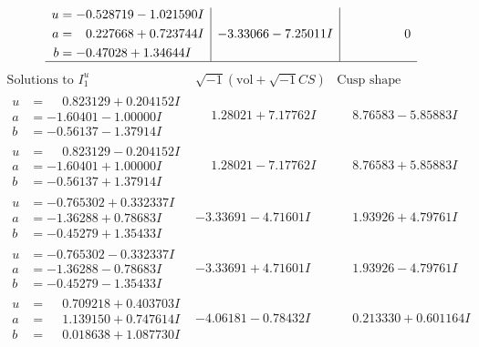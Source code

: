 \documentclass[1p]{elsarticle_modified}
\theoremstyle{definition}
\newcommand{\I}{\sqrt{-1}}
\begin{document}
$$\begin{array}{c|c|c}
\begin{aligned}
u &= -0.528719 - 1.021590 I \\
a &= \phantom{-}0.227668 + 0.723744 I \\
b &= -0.47028 + 1.34644 I\end{aligned}
 & -3.33066 - 7.25011 I & \phantom{-0.000000 } 0\\
 \hline 
 \end{array}$$\newpage$$\begin{array}{c|c|c}  
\text{Solutions to }I^u_{1}& \I (\text{vol} + \sqrt{-1}CS) & \text{Cusp shape}\\
 \hline 
\begin{aligned}
u &= \phantom{-}0.823129 + 0.204152 I \\
a &= -1.60401 - 1.00000 I \\
b &= -0.56137 - 1.37914 I\end{aligned}
 & \phantom{-}1.28021 + 7.17762 I & \phantom{-}8.76583 - 5.85883 I \\ \hline\begin{aligned}
u &= \phantom{-}0.823129 - 0.204152 I \\
a &= -1.60401 + 1.00000 I \\
b &= -0.56137 + 1.37914 I\end{aligned}
 & \phantom{-}1.28021 - 7.17762 I & \phantom{-}8.76583 + 5.85883 I \\ \hline\begin{aligned}
u &= -0.765302 + 0.332337 I \\
a &= -1.36288 + 0.78683 I \\
b &= -0.45279 + 1.35433 I\end{aligned}
 & -3.33691 - 4.71601 I & \phantom{-}1.93926 + 4.79761 I \\ \hline\begin{aligned}
u &= -0.765302 - 0.332337 I \\
a &= -1.36288 - 0.78683 I \\
b &= -0.45279 - 1.35433 I\end{aligned}
 & -3.33691 + 4.71601 I & \phantom{-}1.93926 - 4.79761 I \\ \hline\begin{aligned}
u &= \phantom{-}0.709218 + 0.403703 I \\
a &= \phantom{-}1.139150 + 0.747614 I \\
b &= \phantom{-}0.018638 + 1.087730 I\end{aligned}
 & -4.06181 - 0.78432 I & \phantom{-}0.213330 + 0.601164 I \\ \hline\begin{aligned}

\end{aligned}
\end{array}$$
\end{document}
